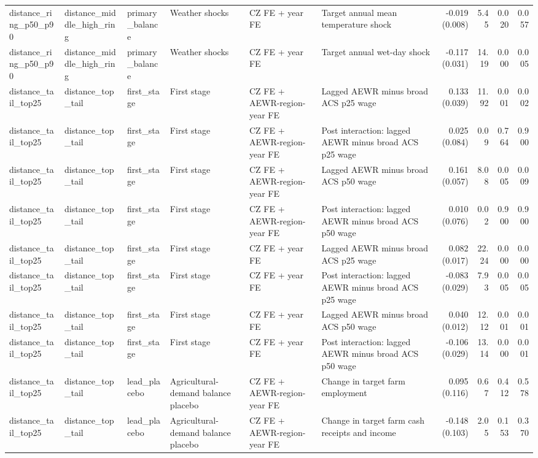 \begin{tabular}{llllllrrrr}
distance_ring_p50_p90 & distance_middle_high_ring & primary_balance & Weather shocks & CZ FE + year FE & Target annual mean temperature shock & -0.019 (0.008) & 5.45 & 0.020 & 0.057 \\
distance_ring_p50_p90 & distance_middle_high_ring & primary_balance & Weather shocks & CZ FE + year FE & Target annual wet-day shock & -0.117 (0.031) & 14.19 & 0.000 & 0.005 \\
distance_tail_top25 & distance_top_tail & first_stage & First stage & CZ FE + AEWR-region-year FE & Lagged AEWR minus broad ACS p25 wage & 0.133 (0.039) & 11.92 & 0.001 & 0.002 \\
distance_tail_top25 & distance_top_tail & first_stage & First stage & CZ FE + AEWR-region-year FE & Post interaction: lagged AEWR minus broad ACS p25 wage & 0.025 (0.084) & 0.09 & 0.764 & 0.900 \\
distance_tail_top25 & distance_top_tail & first_stage & First stage & CZ FE + AEWR-region-year FE & Lagged AEWR minus broad ACS p50 wage & 0.161 (0.057) & 8.08 & 0.005 & 0.009 \\
distance_tail_top25 & distance_top_tail & first_stage & First stage & CZ FE + AEWR-region-year FE & Post interaction: lagged AEWR minus broad ACS p50 wage & 0.010 (0.076) & 0.02 & 0.900 & 0.900 \\
distance_tail_top25 & distance_top_tail & first_stage & First stage & CZ FE + year FE & Lagged AEWR minus broad ACS p25 wage & 0.082 (0.017) & 22.24 & 0.000 & 0.000 \\
distance_tail_top25 & distance_top_tail & first_stage & First stage & CZ FE + year FE & Post interaction: lagged AEWR minus broad ACS p25 wage & -0.083 (0.029) & 7.93 & 0.005 & 0.005 \\
distance_tail_top25 & distance_top_tail & first_stage & First stage & CZ FE + year FE & Lagged AEWR minus broad ACS p50 wage & 0.040 (0.012) & 12.12 & 0.001 & 0.001 \\
distance_tail_top25 & distance_top_tail & first_stage & First stage & CZ FE + year FE & Post interaction: lagged AEWR minus broad ACS p50 wage & -0.106 (0.029) & 13.14 & 0.000 & 0.001 \\
distance_tail_top25 & distance_top_tail & lead_placebo & Agricultural-demand balance placebo & CZ FE + AEWR-region-year FE & Change in target farm employment & 0.095 (0.116) & 0.67 & 0.412 & 0.578 \\
distance_tail_top25 & distance_top_tail & lead_placebo & Agricultural-demand balance placebo & CZ FE + AEWR-region-year FE & Change in target farm cash receipts and income & -0.148 (0.103) & 2.05 & 0.153 & 0.370 \\

\end{tabular}
